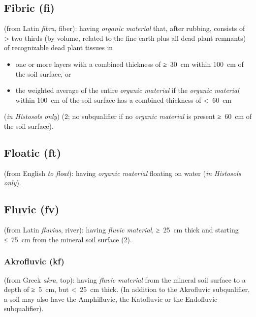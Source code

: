 \documentclass[
  letterpaper,
  DIV=11,
  numbers=noendperiod]{scrreprt}
\providecommand{\tightlist}{%
  \setlength{\itemsep}{0pt}\setlength{\parskip}{0pt}}\usepackage{longtable,booktabs,array}
\begin{document}
\hypertarget{fibric-fi}{%
\subsection{Fibric (fi)}\label{fibric-fi}}

(from Latin \emph{fibra}, fiber): having \emph{organic material} that,
after rubbing, consists of \textgreater{} two thirds (by volume, related
to the fine earth plus all dead plant remnants) of recognizable dead
plant tissues in

\begin{itemize}
\tightlist
\item
  one or more layers with a combined thickness of ≥~30~cm within 100~cm
  of the soil surface, or
\item
  the weighted average of the entire \emph{organic material} if the
  \emph{organic material} within 100~cm of the soil surface has a
  combined thickness of \textless~60~cm
\end{itemize}

(\emph{in Histosols only}) (2; no subqualifier if no \emph{organic
material} is present ≥~60~cm of the soil surface).

\hypertarget{floatic-ft}{%
\subsection{Floatic (ft)}\label{floatic-ft}}

(from English \emph{to float}): having \emph{organic material} floating
on water (\emph{in Histosols only}).

\hypertarget{fluvic-fv}{%
\subsection{Fluvic (fv)}\label{fluvic-fv}}

(from Latin \emph{fluvius}, river): having \emph{fluvic material},
≥~25~cm thick and starting ≤~75~cm from the mineral soil surface (2).

\hypertarget{akrofluvic-kf}{%
\subsubsection{Akrofluvic (kf)}\label{akrofluvic-kf}}

(from Greek \emph{akra}, top): having \emph{fluvic material} from the
mineral soil surface to a depth of ≥~5~cm, but \textless~25~cm thick.
(In addition to the Akrofluvic subqualifier, a soil may also have the
Amphifluvic, the Katofluvic or the Endofluvic subqualifier).
\end{document}
